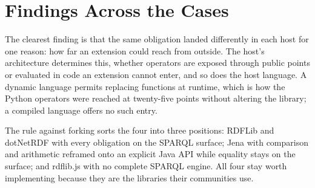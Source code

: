 \section{Findings Across the Cases}

The clearest finding is that the same obligation landed differently in each host for one reason: how far an extension could reach from outside. The host's architecture determines this, whether operators are exposed through public points or evaluated in code an extension cannot enter, and so does the host language. A dynamic language permits replacing functions at runtime, which is how the Python operators were reached at twenty-five points without altering the library; a compiled language offers no such entry. 

The rule against forking sorts the four into three positions: RDFLib and dotNetRDF with every obligation on the SPARQL surface; Jena with comparison and arithmetic reframed onto an explicit Java API while equality stays on the surface; and rdflib.js with no complete SPARQL engine. All four stay worth implementing because they are the libraries their communities use.


